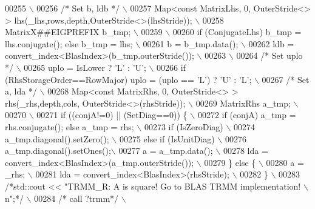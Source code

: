 \begin{DoxyCode}
00255 \textcolor{preprocessor}{\(\backslash\)}
00256 \textcolor{preprocessor}{}\textcolor{comment}{/* Set b, ldb */}\textcolor{preprocessor}{ \(\backslash\)}
00257 \textcolor{preprocessor}{   Map<const MatrixLhs, 0, OuterStride<> > lhs(\_lhs,rows,depth,OuterStride<>(lhsStride)); \(\backslash\)}
00258 \textcolor{preprocessor}{   MatrixX##EIGPREFIX b\_tmp; \(\backslash\)}
00259 \textcolor{preprocessor}{\(\backslash\)}
00260 \textcolor{preprocessor}{   if (ConjugateLhs) b\_tmp = lhs.conjugate(); else b\_tmp = lhs; \(\backslash\)}
00261 \textcolor{preprocessor}{   b = b\_tmp.data(); \(\backslash\)}
00262 \textcolor{preprocessor}{   ldb = convert\_index<BlasIndex>(b\_tmp.outerStride()); \(\backslash\)}
00263 \textcolor{preprocessor}{\(\backslash\)}
00264 \textcolor{preprocessor}{}\textcolor{comment}{/* Set uplo */}\textcolor{preprocessor}{ \(\backslash\)}
00265 \textcolor{preprocessor}{   uplo = IsLower ? 'L' : 'U'; \(\backslash\)}
00266 \textcolor{preprocessor}{   if (RhsStorageOrder==RowMajor) uplo = (uplo == 'L') ? 'U' : 'L'; \(\backslash\)}
00267 \textcolor{preprocessor}{}\textcolor{comment}{/* Set a, lda */}\textcolor{preprocessor}{ \(\backslash\)}
00268 \textcolor{preprocessor}{   Map<const MatrixRhs, 0, OuterStride<> > rhs(\_rhs,depth,cols, OuterStride<>(rhsStride)); \(\backslash\)}
00269 \textcolor{preprocessor}{   MatrixRhs a\_tmp; \(\backslash\)}
00270 \textcolor{preprocessor}{\(\backslash\)}
00271 \textcolor{preprocessor}{   if ((conjA!=0) || (SetDiag==0)) \{ \(\backslash\)}
00272 \textcolor{preprocessor}{     if (conjA) a\_tmp = rhs.conjugate(); else a\_tmp = rhs; \(\backslash\)}
00273 \textcolor{preprocessor}{     if (IsZeroDiag) \(\backslash\)}
00274 \textcolor{preprocessor}{       a\_tmp.diagonal().setZero(); \(\backslash\)}
00275 \textcolor{preprocessor}{     else if (IsUnitDiag) \(\backslash\)}
00276 \textcolor{preprocessor}{       a\_tmp.diagonal().setOnes();\(\backslash\)}
00277 \textcolor{preprocessor}{     a = a\_tmp.data(); \(\backslash\)}
00278 \textcolor{preprocessor}{     lda = convert\_index<BlasIndex>(a\_tmp.outerStride()); \(\backslash\)}
00279 \textcolor{preprocessor}{   \} else \{ \(\backslash\)}
00280 \textcolor{preprocessor}{     a = \_rhs; \(\backslash\)}
00281 \textcolor{preprocessor}{     lda = convert\_index<BlasIndex>(rhsStride); \(\backslash\)}
00282 \textcolor{preprocessor}{   \} \(\backslash\)}
00283 \textcolor{preprocessor}{   }\textcolor{comment}{/*std::cout << "TRMM\_R: A is square! Go to BLAS TRMM implementation! \(\backslash\)n";*/}\textcolor{preprocessor}{ \(\backslash\)}
00284 \textcolor{preprocessor}{}\textcolor{comment}{/* call ?trmm*/}\textcolor{preprocessor}{ \(\backslash\)}

\end{DoxyCode}
